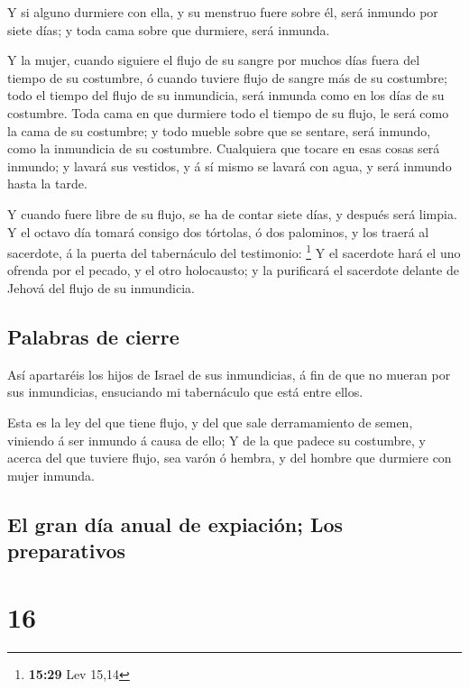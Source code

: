 Y si alguno durmiere con ella, y su menstruo fuere sobre
él, será inmundo por siete días; y toda cama sobre que durmiere, será
inmunda.

 Y la mujer, cuando siguiere el flujo de su sangre por
muchos días fuera del tiempo de su costumbre, ó cuando tuviere flujo de
sangre más de su costumbre; todo el tiempo del flujo de su inmundicia,
será inmunda como en los días de su costumbre.  Toda cama
en que durmiere todo el tiempo de su flujo, le será como la cama de su
costumbre; y todo mueble sobre que se sentare, será inmundo, como la
inmundicia de su costumbre.  Cualquiera que tocare en
esas cosas será inmundo; y lavará sus vestidos, y á sí mismo se lavará
con agua, y será inmundo hasta la tarde.

 Y cuando fuere libre de su flujo, se ha de contar siete
días, y después será limpia.  Y el octavo día tomará
consigo dos tórtolas, ó dos palominos, y los traerá al sacerdote, á la
puerta del tabernáculo del testimonio: \footnote{\textbf{15:29} Lev
  15,14}  Y el sacerdote hará el uno ofrenda por el
pecado, y el otro holocausto; y la purificará el sacerdote delante de
Jehová del flujo de su inmundicia.

\hypertarget{palabras-de-cierre}{%
\subsection{Palabras de cierre}\label{palabras-de-cierre}}

 Así apartaréis los hijos de Israel de sus inmundicias, á
fin de que no mueran por sus inmundicias, ensuciando mi tabernáculo que
está entre ellos.

 Esta es la ley del que tiene flujo, y del que sale
derramamiento de semen, viniendo á ser inmundo á causa de ello;
 Y de la que padece su costumbre, y acerca del que
tuviere flujo, sea varón ó hembra, y del hombre que durmiere con mujer
inmunda.

\hypertarget{el-gran-duxeda-anual-de-expiaciuxf3n-los-preparativos}{%
\subsection{El gran día anual de expiación; Los
preparativos}\label{el-gran-duxeda-anual-de-expiaciuxf3n-los-preparativos}}

\hypertarget{section-15}{%
\section{16}\label{section-15}}


